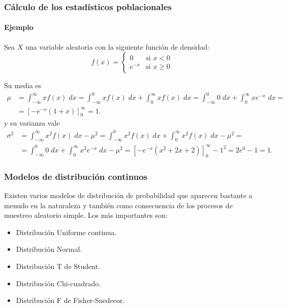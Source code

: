 \begin{frame}
\frametitle{Cálculo de los estadísticos poblacionales}
\framesubtitle{Ejemplo}
Sea $X$ una variable aleatoria con la siguiente función de densidad:
\[
f(x) = 
\begin{cases}
0 & \mbox{si $x<0$}\\
e^{-x} & \mbox{si $x\geq 0$}
\end{cases}
\]

Su media es
\begin{align*}
\mu &= \int_{-\infty}^\infty xf(x)\;dx = \int_{-\infty}^0 xf(x)\;dx +\int_0^\infty xf(x)\;dx = \int_{-\infty}^0 0\;dx +\int_0^\infty xe^{-x}\;dx =\\
&= \left[-e^{-x}(1+x)\right]_0^{\infty} = 1.
\end{align*}
y su varianza vale
\begin{align*}
\sigma^2 &= \int_{-\infty}^\infty x^2f(x)\;dx -\mu^2 = \int_{-\infty}^0 x^2f(x)\;dx +\int_0^\infty x^2f(x)\;dx -\mu^2 = \\
&= \int_{-\infty}^0 0\;dx +\int_0^\infty x^2e^{-x}\;dx -\mu^2= \left[-e^{-x}(x^2+2x+2)\right]_0^{\infty} - 1^2= 2e^0-1 = 1.
\end{align*}

\end{frame}



\begin{frame}
\frametitle{Modelos de distribución continuos}
Existen varios modelos de distribución de probabilidad que aparecen bastante a menudo en la naturaleza y también como consecuencia de los
procesos de muestreo aleatorio simple.
Los más importantes son:

\begin{itemize}
\item Distribución Uniforme continua.
\item Distribución Normal.
\item Distribución T de Student.
\item Distribución Chi-cuadrado.
\item Distribución F de Fisher-Snedecor.
\end{itemize}

\end{frame}


